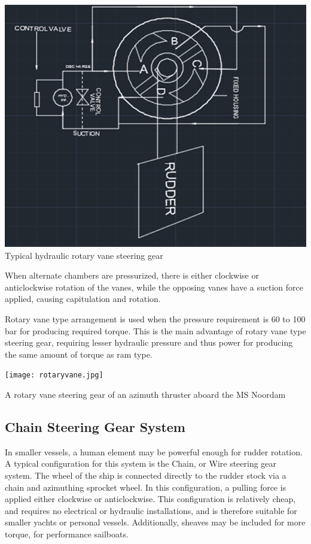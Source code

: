 \documentclass[11pt,a4paper]{article}
\begin{document}
\begin{center}
\includegraphics[width=\textwidth]{vane.png}
Typical hydraulic rotary vane steering gear
\end{center}

When alternate chambers are pressurized, there is either clockwise or anticlockwise rotation of the vanes, while the opposing vanes have a suction force applied, causing capitulation and rotation.

Rotary vane type arrangement is used when the pressure requirement is 60 to 100 bar for producing required torque. This is the main advantage of rotary vane type steering gear, requiring lesser hydraulic pressure and thus power for producing the same amount of torque as ram type.\cite{m5}

\begin{center}
\texttt{[image: rotaryvane.jpg]}\par
A rotary vane steering gear of an azimuth thruster aboard the MS Noordam
\end{center}

\subsection{Chain Steering Gear System}
In smaller vessels, a human element may be powerful enough for rudder rotation. A typical configuration for this system is the Chain, or Wire steering gear system. The wheel of the ship is connected directly to the rudder stock via a chain and azimuthing sprocket wheel. In this configuration, a pulling force is applied either clockwise or anticlockwise. This configuration is relatively cheap, and requires no electrical or hydraulic installations, and is therefore suitable for smaller yachts or personal vessels. Additionally, sheaves may be included for more torque, for performance sailboats.
\end{document}
